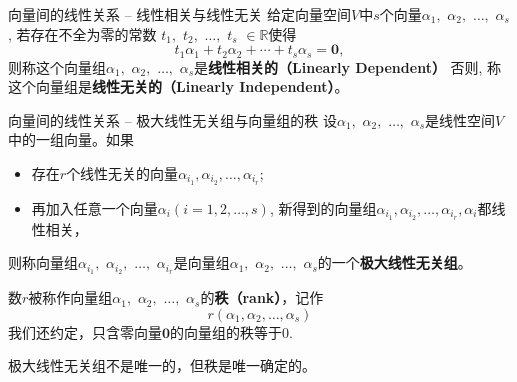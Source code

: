 
\begin{frame}

\begin{block}{向量间的线性关系 -- 线性相关与线性无关}
给定向量空间$V$中$s$个向量$\alpha_1,$ $\alpha_2,$ $\ldots,$ $\alpha_s$, 若存在{\color{red}不全为零}的常数 $t_1,$ $t_2,$ $\dots,$ $t_s$ $\in \mathbb{R}$使得
\[t_1 \alpha_1 + t_2 \alpha_2 + \cdots + t_s \alpha_s = \mathbf{0},\]
则称这个向量组$\alpha_1,$ $\alpha_2,$ $\ldots,$ $\alpha_s$是{\bfseries 线性相关的（Linearly Dependent）}
\newline \pause \vspace{1em}
否则, 称这个向量组是{\bfseries 线性无关的（Linearly Independent）}。
\end{block}

\end{frame}


\begin{frame}

\begin{block}{向量间的线性关系 -- 极大线性无关组与向量组的秩}
设$\alpha_1,$ $\alpha_2,$ $\ldots,$ $\alpha_s$是线性空间$V$中的一组向量。如果
\begin{itemize}
\item 存在$r$个线性无关的向量$\alpha_{i_1}, \alpha_{i_2}, \ldots, \alpha_{i_r}$;
\item 再加入任意一个向量$\alpha_i (i=1,2,\ldots,s)$, 新得到的向量组$\alpha_{i_1}, \alpha_{i_2}, \ldots, \alpha_{i_r}, \alpha_i$都线性相关，
\end{itemize}
则称向量组$\alpha_{i_1},$ $\alpha_{i_2},$ $\ldots,$ $\alpha_{i_r}$是向量组$\alpha_1,$ $\alpha_2,$ $\ldots,$ $\alpha_s$的一个{\bfseries 极大线性无关组}。

\pause

数$r$被称作向量组$\alpha_1,$ $\alpha_2,$ $\ldots,$ $\alpha_s$的{\bfseries 秩（rank）}，记作
\[r(\alpha_1, \alpha_2, \ldots, \alpha_s)\]
我们还约定，只含零向量$\mathbf{0}$的向量组的秩等于$0$.
\end{block}

\begin{remark}
极大线性无关组{\color{red}不是}唯一的，但秩是唯一确定的。
\end{remark}

\end{frame}


